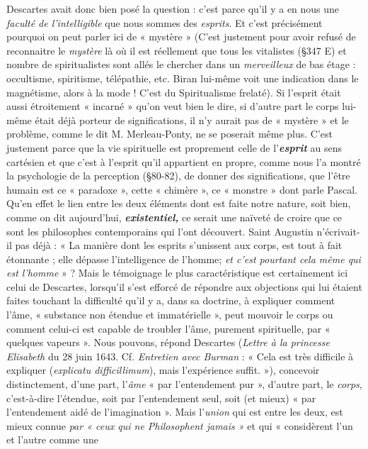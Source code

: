 Descartes avait donc bien posé la question : c'est parce qu'il
y a en nous une {\it faculté de l’intelligible} que nous sommes des {\it esprits}.
Et c’est précisément pourquoi on peut parler ici de « mystère »
{\scriptsize (C'est justement pour avoir refusé de reconnaitre le {\it mystère} là où il est réellement
que tous les vitalistes (\S 347 E) et nombre de spiritualistes sont allés le chercher dans
un {\it merveilleux} de bas étage : occultisme, spiritisme, télépathie, etc. Biran lui-même voit
une indication dans le magnétisme, alors à la mode ! C'est du Spiritualisme frelaté)}. Si
l'esprit était aussi étroitement « incarné » qu'on veut bien le dire,
si d'autre part le corps lui-même était déjà porteur de significations,
il n'y aurait pas de « mystère » et le problème, comme le dit M. Merleau-Ponty,
ne se poserait même plus. C’est justement parce que la
vie spirituelle est proprement celle de l'\textbf{\textit {esprit}} au sens cartésien et
que c’est à l’esprit qu’il appartient en propre, comme nous l’a montré
la psychologie de la perception (\S 80-82), de donner des significations,
que l’être humain est ce « paradoxe », cette « chimère », ce
« monstre » dont parle Pascal. Qu’en effet le lien entre les deux éléments
dont est faite notre nature, soit bien, comme on dit aujourd’hui,
\textbf{\textit {existentiel,}} ce serait une naïveté de croire que ce sont les
philosophes contemporains qui l’ont découvert. Saint Augustin
n’écrivait-il pas déjà : « La manière dont les esprits s’unissent aux
corps, est tout à fait étonnante ; elle dépasse l’intelligence de l’homme;
{\it et c'est pourtant cela même qui est l'homme} » ? Mais le témoignage le
plus caractéristique est certainement ici celui de Descartes, lorsqu'il
s’est efforcé de répondre aux objections qui lui étaient faites touchant
la difficulté qu’il y a, dans sa doctrine, à expliquer comment l’âme,
« substance non étendue et immatérielle », peut mouvoir le corps ou
comment celui-ci est capable de troubler l’âme, purement spirituelle,
par « quelques vapeurs ». Nous pouvons, répond Descartes
{\scriptsize ({\it Lettre à la princesse Elisabeth} du 28 juin 1643. Cf. {\it Entretien avec Burman} : « Cela
est très difficile à expliquer ({\it explicatu difficillimum}), mais l'expérience suffit. »)}, concevoir
distinctement, d’une part, l'{\it âme} « par l’entendement pur »,
d’autre part, le {\it corps}, c’est-à-dire l'étendue, soit par l’entendement
seul, soit (et mieux) « par l’entendement aidé de l’imagination ». Mais
l'{\it union} qui est entre les deux, est mieux connue {\it par « ceux qui ne
Philosophent jamais »} et qui « considèrent l’un et l’autre comme une
